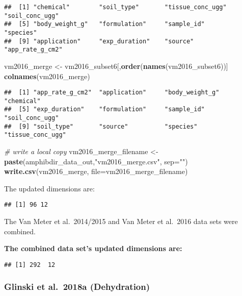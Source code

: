 \documentclass[
]{article}
\newenvironment{Shaded}{\begin{snugshade}}{\end{snugshade}}
\newcommand{\CommentTok}[1]{\textcolor[rgb]{0.56,0.35,0.01}{\textit{#1}}}
\newcommand{\DataTypeTok}[1]{\textcolor[rgb]{0.13,0.29,0.53}{#1}}
\newcommand{\KeywordTok}[1]{\textcolor[rgb]{0.13,0.29,0.53}{\textbf{#1}}}
\newcommand{\NormalTok}[1]{#1}
\newcommand{\StringTok}[1]{\textcolor[rgb]{0.31,0.60,0.02}{#1}}
\begin{document}
\begin{verbatim}
##  [1] "chemical"        "soil_type"       "tissue_conc_ugg" "soil_conc_ugg"  
##  [5] "body_weight_g"   "formulation"     "sample_id"       "species"        
##  [9] "application"     "exp_duration"    "source"          "app_rate_g_cm2"
\end{verbatim}

\begin{Shaded}
\begin{Highlighting}[]
\NormalTok{vm2016_merge <-}\StringTok{ }\NormalTok{vm2016_subset6[,}\KeywordTok{order}\NormalTok{(}\KeywordTok{names}\NormalTok{(vm2016_subset6))]}
\KeywordTok{colnames}\NormalTok{(vm2016_merge)}
\end{Highlighting}
\end{Shaded}

\begin{verbatim}
##  [1] "app_rate_g_cm2"  "application"     "body_weight_g"   "chemical"       
##  [5] "exp_duration"    "formulation"     "sample_id"       "soil_conc_ugg"  
##  [9] "soil_type"       "source"          "species"         "tissue_conc_ugg"
\end{verbatim}

\begin{Shaded}
\begin{Highlighting}[]
\CommentTok{# write a local copy}
\NormalTok{vm2016_merge_filename <-}\StringTok{ }\KeywordTok{paste}\NormalTok{(amphibdir_data_out,}\StringTok{"vm2016_merge.csv"}\NormalTok{, }\DataTypeTok{sep=}\StringTok{""}\NormalTok{)}
\KeywordTok{write.csv}\NormalTok{(vm2016_merge, }\DataTypeTok{file=}\NormalTok{vm2016_merge_filename)}
\end{Highlighting}
\end{Shaded}

The updated dimensions are:

\begin{verbatim}
## [1] 96 12
\end{verbatim}

The Van Meter et al.~2014/2015 and Van Meter et al.~2016 data sets were
combined.

\textbf{The combined data set's updated dimensions are:}

\begin{verbatim}
## [1] 292  12
\end{verbatim}

\hypertarget{glinski-et-al.-2018a-dehydration-1}{%
\subsubsection{Glinski et al.~2018a
(Dehydration)}\label{glinski-et-al.-2018a-dehydration-1}}
\end{document}
